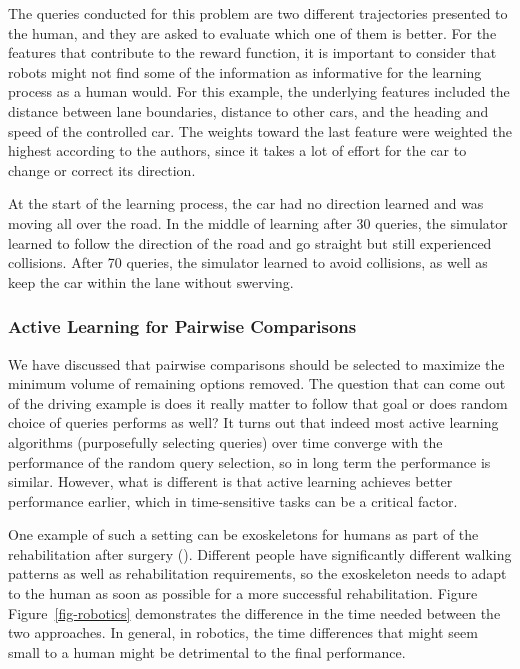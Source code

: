 \documentclass[
  letterpaper,
  numbers=noenddot,
  DIV=11]{scrreprt}
\theoremstyle{definition}
\theoremstyle{plain}
\theoremstyle{plain}
\theoremstyle{remark}
\begin{document}
The queries conducted for this problem are two different trajectories
presented to the human, and they are asked to evaluate which one of them
is better. For the features that contribute to the reward function, it
is important to consider that robots might not find some of the
information as informative for the learning process as a human would.
For this example, the underlying features included the distance between
lane boundaries, distance to other cars, and the heading and speed of
the controlled car. The weights toward the last feature were weighted
the highest according to the authors, since it takes a lot of effort for
the car to change or correct its direction.

At the start of the learning process, the car had no direction learned
and was moving all over the road. In the middle of learning after 30
queries, the simulator learned to follow the direction of the road and
go straight but still experienced collisions. After 70 queries, the
simulator learned to avoid collisions, as well as keep the car within
the lane without swerving.

\subsubsection*{Active Learning for Pairwise
Comparisons}\label{active-learning-for-pairwise-comparisons}

We have discussed that pairwise comparisons should be selected to
maximize the minimum volume of remaining options removed. The question
that can come out of the driving example is does it really matter to
follow that goal or does random choice of queries performs as well? It
turns out that indeed most active learning algorithms (purposefully
selecting queries) over time converge with the performance of the random
query selection, so in long term the performance is similar. However,
what is different is that active learning achieves better performance
earlier, which in time-sensitive tasks can be a critical factor.

One example of such a setting can be exoskeletons for humans as part of
the rehabilitation after surgery (). Different people have significantly different walking patterns
as well as rehabilitation requirements, so the exoskeleton needs to
adapt to the human as soon as possible for a more successful
rehabilitation. Figure Figure~\ref{fig-robotics} demonstrates the
difference in the time needed between the two approaches. In general, in
robotics, the time differences that might seem small to a human might be
detrimental to the final performance.
\end{document}
